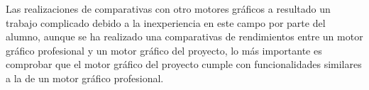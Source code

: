 \documentclass[a4paper, 17pt]{book}
\begin{document}
\vspace{1mm} %

Las realizaciones de comparativas con otro motores gráficos a resultado un trabajo complicado debido a la inexperiencia en
este campo por parte del alumno, aunque se ha realizado una comparativas de rendimientos entre un motor gráfico profesional
y un motor gráfico del proyecto, lo más importante es comprobar que el motor gráfico del proyecto cumple con funcionalidades
similares a la de un motor gráfico profesional.




\cleardoublepage





\nocite{*}

\end{document}
